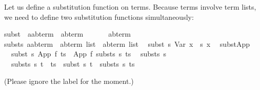 \begin{isabellebody}
\begin{isamarkuptext}
Let us define a substitution function on terms. Because terms involve term
lists, we need to define two substitution functions simultaneously:%
\end{isamarkuptext}%
\isanewline
subst\ {\isacharcolon}{\isacharcolon}\ {\isachardoublequote}{\isacharparenleft}{\isacharprime}a{\isasymRightarrow}{\isacharparenleft}{\isacharprime}a{\isacharcomma}{\isacharprime}b{\isacharparenright}term{\isacharparenright}\ {\isasymRightarrow}\ {\isacharparenleft}{\isacharprime}a{\isacharcomma}{\isacharprime}b{\isacharparenright}term\ \ \ \ \ \ {\isasymRightarrow}\ {\isacharparenleft}{\isacharprime}a{\isacharcomma}{\isacharprime}b{\isacharparenright}term{\isachardoublequote}\isanewline
substs{\isacharcolon}{\isacharcolon}\ {\isachardoublequote}{\isacharparenleft}{\isacharprime}a{\isasymRightarrow}{\isacharparenleft}{\isacharprime}a{\isacharcomma}{\isacharprime}b{\isacharparenright}term{\isacharparenright}\ {\isasymRightarrow}\ {\isacharparenleft}{\isacharprime}a{\isacharcomma}{\isacharprime}b{\isacharparenright}term\ list\ {\isasymRightarrow}\ {\isacharparenleft}{\isacharprime}a{\isacharcomma}{\isacharprime}b{\isacharparenright}term\ list{\isachardoublequote}\isanewline
\isanewline
{}\isanewline
\ \ {\isachardoublequote}subst\ s\ {\isacharparenleft}Var\ x{\isacharparenright}\ {\isacharequal}\ s\ x{\isachardoublequote}\isanewline
\ \ subst{\isacharunderscore}App{\isacharcolon}\isanewline
\ \ {\isachardoublequote}subst\ s\ {\isacharparenleft}App\ f\ ts{\isacharparenright}\ {\isacharequal}\ App\ f\ {\isacharparenleft}substs\ s\ ts{\isacharparenright}{\isachardoublequote}\isanewline
\isanewline
\ \ {\isachardoublequote}substs\ s\ {\isacharbrackleft}{\isacharbrackright}\ {\isacharequal}\ {\isacharbrackleft}{\isacharbrackright}{\isachardoublequote}\isanewline
\ \ {\isachardoublequote}substs\ s\ {\isacharparenleft}t\ {\isacharhash}\ ts{\isacharparenright}\ {\isacharequal}\ subst\ s\ t\ {\isacharhash}\ substs\ s\ ts{\isachardoublequote}%
\begin{isamarkuptext}%
\noindent
(Please ignore the label  for the moment.)


\end{isamarkuptext}
\end{isabellebody}

